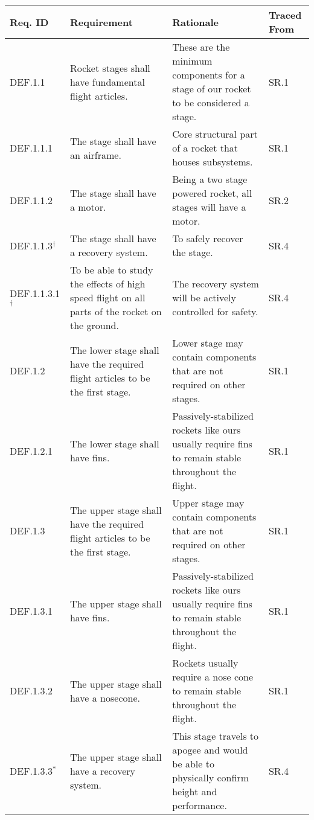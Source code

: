\begin{table}[htbp]
    \centering
    \footnotesize 
    \setlength{\tymin}{40pt}
    \let\raggedright\RaggedRight
    
    \begin{tabulary}{\textwidth}{@{}LLLL@{}}
    \toprule
        \textbf{Req. ID} & \textbf{Requirement} & \textbf{Rationale} & \textbf{Traced From} \\
    \midrule
        DEF.1.1 & Rocket stages shall have fundamental flight articles. & These are the minimum components for a stage of our rocket to be considered a stage. & SR.1 \\
        DEF.1.1.1 & The stage shall have an airframe. & Core structural part of a rocket that houses subsystems. & SR.1 \\ 
        DEF.1.1.2 & The stage shall have a motor. & Being a two stage powered rocket, all stages will have a motor. & SR.2 \\
        DEF.1.1.3\(^\dagger\) & The stage shall have a recovery system. & To safely recover the stage. & SR.4 \\
        DEF.1.1.3.1\(^\dagger\) & To be able to study the effects of high speed flight on all parts of the rocket on the ground. & The recovery system will be actively controlled for safety. & SR.4 \\
    \midrule
        DEF.1.2 & The lower stage shall have the required flight articles to be the first stage. & Lower stage may contain components that are not required on other stages. & SR.1 \\
        DEF.1.2.1 & The lower stage shall have fins. & Passively-stabilized rockets like ours usually require fins to remain stable throughout the flight. & SR.1 \\
    \midrule
        DEF.1.3 & The upper stage shall have the required flight articles to be the first stage. & Upper stage may contain components that are not required on other stages. & SR.1 \\
        DEF.1.3.1 & The upper stage shall have fins. & Passively-stabilized rockets like ours usually require fins to remain stable throughout the flight. & SR.1 \\
        DEF.1.3.2 & The upper stage shall have a nosecone. & Rockets usually require a nose cone to remain stable throughout the flight. & SR.1 \\
        DEF.1.3.3\(^*\) & The upper stage shall have a recovery system. & This stage travels to apogee and would be able to physically confirm height and performance. & SR.4 \\

\end{tabulary}
\end{table}

